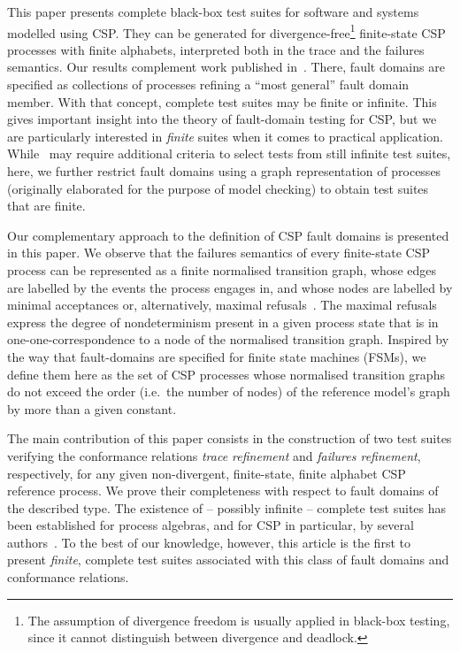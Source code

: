 This paper presents complete black-box test suites for software and systems
modelled using CSP.
They can be generated for divergence-free\footnote{The assumption of divergence freedom is usually
applied in black-box testing, since it cannot distinguish between divergence
and deadlock.} finite-state CSP processes with finite alphabets,   
interpreted both in the trace and the failures semantics.
Our results complement work published in~\cite{DBLP:conf/pts/CavalcantiS17}.
There, fault domains are specified as collections of processes refining a
``most general'' fault domain member. With that concept, complete test suites
may be finite or infinite. This gives important insight into the theory of
fault-domain testing for CSP, but we are particularly interested in {\it
finite} suites when it comes to practical application.
While~\cite{DBLP:conf/pts/CavalcantiS17} may require additional criteria to
select tests from still infinite test suites, here, we further restrict fault
domains using a graph representation of processes (originally elaborated
for the purpose of model checking) to
obtain test suites that are finite.

Our complementary approach to the definition of CSP fault domains is
presented in this paper. We observe that the failures semantics of 
every finite-state CSP process can
be represented as a finite normalised transition graph, whose edges are
labelled by the events the process engages in, and whose nodes are labelled
by minimal acceptances or, alternatively, maximal
refusals~\cite{Roscoe:1994:CME:197600}. The maximal refusals express the
degree of nondeterminism present in a given process state that is in
one-one-correspondence to a node of the normalised transition graph. Inspired
by the way that fault-domains are specified for finite state machines (FSMs),
we define them here as the set of CSP processes whose normalised transition graphs
do not exceed the order (i.e.~the number of nodes) 
of the reference model's graph by more than a given
constant.

The main contribution of this paper consists in the construction of two test suites
verifying the conformance relations \emph{trace refinement} and  \emph{failures refinement}, respectively, for any given non-divergent, finite-state, finite alphabet 
CSP reference process. We prove their completeness with respect to fault domains
of the described type.  The
existence of -- possibly infinite -- complete test suites has been
established for process algebras, and for CSP in particular, by several
authors~\cite{Hennessy:1988:ATP:50497,Schneider:1995:OST:203471.203475,DBLP:conf/fm/PeleskaS96,peleska1997a,DBLP:conf/pts/CavalcantiS17}.
To the best of our knowledge, however, this article is the first to present
{\it finite}, complete test suites associated with this class of fault
domains and conformance relations.

